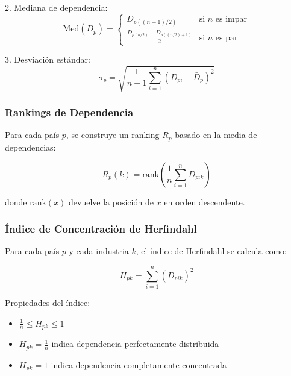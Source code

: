 \documentclass[11pt,a4paper]{article}
\begin{document}
2. Mediana de dependencia:
\begin{equation}
\text{Med}(D_p) = \begin{cases}
D_{p((n+1)/2)} & \text{si } n \text{ es impar} \\
\frac{D_{p(n/2)} + D_{p((n/2)+1)}}{2} & \text{si } n \text{ es par}
\end{cases}
\end{equation}

3. Desviación estándar:
\begin{equation}
\sigma_p = \sqrt{\frac{1}{n-1} \sum_{i=1}^n (D_{pi} - \bar{D}_p)^2}
\end{equation}

\subsubsection{Rankings de Dependencia}

Para cada país $p$, se construye un ranking $R_p$ basado en la media de dependencias:

\begin{equation}
R_p(k) = \text{rank}\left(\frac{1}{n}\sum_{i=1}^n D_{pik}\right)
\end{equation}

donde $\text{rank}(x)$ devuelve la posición de $x$ en orden descendente.

\subsubsection{Índice de Concentración de Herfindahl}

Para cada país $p$ y cada industria $k$, el índice de Herfindahl se calcula como:

\begin{equation}
H_{pk} = \sum_{i=1}^n (D_{pik})^2
\end{equation}

Propiedades del índice:
\begin{itemize}
    \item $\frac{1}{n} \leq H_{pk} \leq 1$
    \item $H_{pk} = \frac{1}{n}$ indica dependencia perfectamente distribuida
    \item $H_{pk} = 1$ indica dependencia completamente concentrada
\end{itemize}
\end{document}
